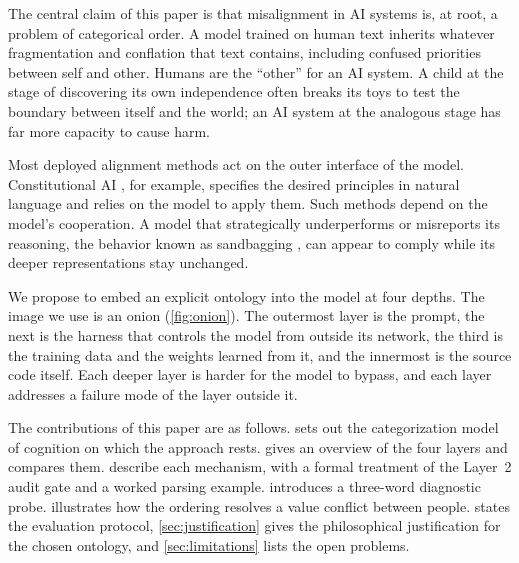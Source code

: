 \documentclass[twocolumn]{ulpaper}
\begin{document}
The central claim of this paper is that misalignment in AI systems is, at root, a problem of categorical order. A model trained on human text inherits whatever fragmentation and conflation that text contains, including confused priorities between self and other. Humans are the ``other'' for an AI system. A child at the stage of discovering its own independence often breaks its toys to test the boundary between itself and the world; an AI system at the analogous stage has far more capacity to cause harm.

Most deployed alignment methods act on the outer interface of the model. Constitutional AI \citep{bai2022constitutional}, for example, specifies the desired principles in natural language and relies on the model to apply them. Such methods depend on the model's cooperation. A model that strategically underperforms or misreports its reasoning, the behavior known as sandbagging \citep{vanderweij2024sandbagging}, can appear to comply while its deeper representations stay unchanged.

We propose to embed an explicit ontology into the model at four depths. The image we use is an onion (\cref{fig:onion}). The outermost layer is the prompt, the next is the harness that controls the model from outside its network, the third is the training data and the weights learned from it, and the innermost is the source code itself. Each deeper layer is harder for the model to bypass, and each layer addresses a failure mode of the layer outside it.

The contributions of this paper are as follows.  sets out the categorization model of cognition on which the approach rests.  gives an overview of the four layers and compares them.  describe each mechanism, with a formal treatment of the Layer~2 audit gate and a worked parsing example.  introduces a three-word diagnostic probe.  illustrates how the ordering resolves a value conflict between people.  states the evaluation protocol, \cref{sec:justification} gives the philosophical justification for the chosen ontology, and \cref{sec:limitations} lists the open problems.
\end{document}

